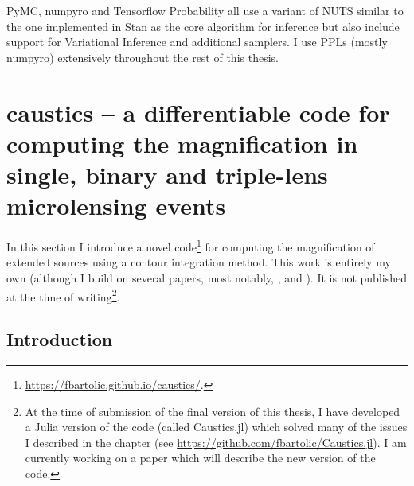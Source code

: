\documentclass[12pt,dvipsnames]{report}
\newcommand{\ssf}[1]{\textsf{#1}}
\begin{document}
\ssf{PyMC}, \ssf{numpyro}
and \ssf{Tensorflow Probability} all use a variant of NUTS similar to the one 
implemented in \ssf{Stan} as the core algorithm for inference but also 
include support for Variational Inference and additional samplers. 
I use PPLs (mostly \ssf{numpyro}) extensively throughout the rest of this thesis.

\chapter{\ssf{caustics} -- a differentiable code for computing the
  magnification in single, binary and triple-lens microlensing events}
\label{ch:caustics}

In this section I introduce a novel 
code\footnote{\url{https://fbartolic.github.io/caustics/}.} 
for computing the magnification of extended 
sources using a contour integration method. This work is entirely my own (although I build on 
several papers, most notably, \citet{2021MNRAS.503.6143K}, \citet{1998A&A...333L..79D} and 
\citet{2018MNRAS.479.5157B}). It is not published at the time of writing\footnote{
    At the time of submission of the final version of this thesis, I have developed a \ssf{Julia}
    version of the code (called \ssf{Caustics.jl}) which solved many of the issues I described in the chapter
    (see \url{https://github.com/fbartolic/Caustics.jl}).
    I am currently working on a paper which will describe the new version of the code.
}.

\section{Introduction}
\end{document}
